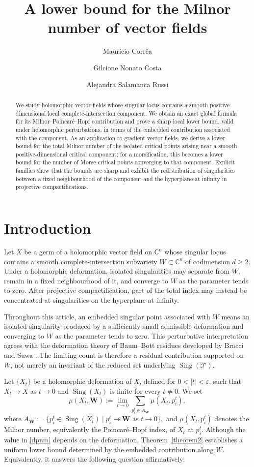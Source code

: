 \documentclass[10pt,twoside]{amsart}
\title[Milnor number of vector fields]{A lower bound for the Milnor number of vector fields}
\author[M. Corr\^ea]{Maur\'icio Corr\^ea}
\author[G. N. Costa]{Gilcione Nonato Costa}
\author[A. S. Russi]{Alejandra Salamanca Russi}
\numberwithin{equation}{section}
\theoremstyle{definition}
\theoremstyle{remark}
\DeclareMathOperator{\sing}{Sing}
\newcommand{\C}{\mathbb{C}}
\newcommand{\fol}{\mathcal{F}}
\newcommand{\W}{\mathbf{W}}
\begin{document}
 \begin{abstract}
We study holomorphic vector fields whose singular locus contains a smooth
positive-dimensional local complete-intersection component. We obtain an
exact global formula for its Milnor--Poincar\'e--Hopf contribution and prove
a sharp local lower bound, valid under holomorphic perturbations, in terms
of the embedded contribution associated with the component. As an
application to gradient vector fields, we derive a lower bound for the
total Milnor number of the isolated critical points arising near a smooth
positive-dimensional critical component; for a morsification, this becomes
a lower bound for the number of Morse critical points converging to that
component. Explicit families show that the bounds are sharp and exhibit
the redistribution of singularities between a fixed neighbourhood of the
component and the hyperplane at infinity in projective compactifications.
\end{abstract}
\maketitle
\section{Introduction}

Let $X$ be a germ of a holomorphic vector field on $\C^n$ whose singular locus contains a smooth complete-intersection subvariety $W\subset\C^n$ of codimension $d\geq2$. Under a holomorphic deformation, isolated singularities may separate from $W$, remain in a fixed neighbourhood of it, and converge to $W$ as the parameter tends to zero. After projective compactification, part of the total index may instead be concentrated at singularities on the hyperplane at infinity.

Throughout this article, an embedded singular point associated with $W$ means an isolated singularity produced by a sufficiently small admissible deformation and converging to $W$ as the parameter tends to zero. This perturbative interpretation agrees with the deformation theory of Baum--Bott residues developed by Bracci and Suwa \cite{BracciSuwa}. The limiting count is therefore a residual contribution supported on $W$, not merely an invariant of the reduced set underlying $\sing(\fol)$.

Let $\{X_t\}$ be a holomorphic deformation of $X$, defined for $0<|t|<\varepsilon$, such that $X_t\to X$ as $t\to0$ and $\sing(X_t)$ is finite for every $t\neq0$. We set
\begin{equation}\label{dpnm}
\mu(X_t,\W):=\lim_{t\to0}\sum_{p_i^t\in A_{\W}}\mu(X_t,p_i^t),
\end{equation}
where
$
A_{\W}:=\bigl\{p_i^t\in\sing(X_t)\mid p_i^t\to\W\text{ as }t\to0\bigr\},$
and $\mu(X_t,p_i^t)$ denotes the Milnor number, equivalently the Poincar\'e--Hopf index, of $X_t$ at $p_i^t$. Although the value in \eqref{dpnm} depends on the deformation, Theorem~\ref{theorem2} establishes a uniform lower bound determined by the embedded contribution along $W$. Equivalently, it answers the following question affirmatively:
\end{document}
